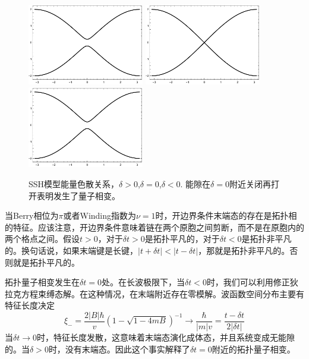 \documentclass{article}
\numberwithin{equation}{subsection}
\begin{document}
\begin{figure}[h]
    \centering
    \includegraphics[width=2in]{SSHenergy1.pdf}
    \includegraphics[width=2in]{SSHenergy2.pdf}
    \includegraphics[width=2in]{SSHenergy3.pdf}
    \caption{\footnotesize{SSH模型能量色散关系，$\delta>0$,$\delta=0$,$\delta<0$. 能隙在$\delta=0$附近关闭再打开表明发生了量子相变。}}\label{dirac pic 7}
\end{figure}
当Berry相位为$\pi$或者Winding指数为$\nu=1$时，开边界条件末端态的存在是拓扑相的特征。应该注意，开边界条件意味着链在两个原胞之间剪断，而不是在原胞内的两个格点之间。假设$t>0$，对于$\delta t>0$是拓扑平凡的，对于$\delta t<0$是拓扑非平凡的。换句话说，如果末端键是长键，$|t+\delta t|<|t-\delta t|$，那就是拓扑非平凡的。否则就是拓扑平凡的。

拓扑量子相变发生在$\delta t=0$处。在长波极限下，当$\delta t<0$时，我们可以利用修正狄拉克方程束缚态解。在这种情况，在末端附近存在零模解。波函数空间分布主要有特征长度决定
\begin{equation}
    \xi_-=\frac{2|B|\hbar}{v}(1-\sqrt{1-4mB})^{-1}\to\frac{\hbar}{|m|v}=\frac{t-\delta t}{2|\delta t|}
\end{equation}
当$\delta t\to0$时，特征长度发散，这意味着末端态演化成体态，并且系统变成无能隙的。当$\delta>0$时，没有末端态。因此这个事实解释了$\delta t=0$附近的拓扑量子相变。
\end{document}
